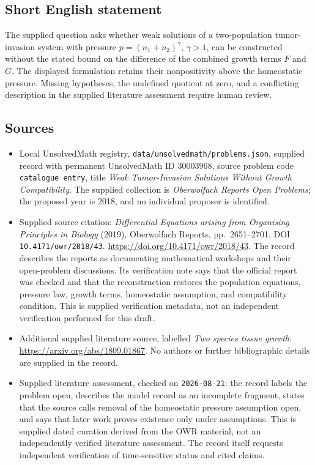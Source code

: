 \documentclass[11pt]{article}
\begin{document}
\subsection{Short English statement}
The supplied question asks whether weak solutions of a two-population tumor-invasion system with pressure \(p=(n_1+n_2)^\gamma\), \(\gamma>1\), can be constructed without the stated bound on the difference of the combined growth terms \(F\) and \(G\). The displayed formulation retains their nonpositivity above the homeostatic pressure. Missing hypotheses, the undefined quotient at zero, and a conflicting description in the supplied literature assessment require human review.
\subsection{Sources}
\begin{itemize}
\item Local UnsolvedMath registry, \texttt{data/unsolvedmath/problems.json}, supplied record with permanent UnsolvedMath ID \(30003968\), source problem code \texttt{catalogue entry}, title \emph{Weak Tumor-Invasion Solutions Without Growth Compatibility}. The supplied collection is \emph{Oberwolfach Reports Open Problems}; the proposed year is 2018, and no individual proposer is identified.
\item Supplied source citation: \emph{Differential Equations arising from Organising Principles in Biology} (2019), Oberwolfach Reports, pp.\ 2651--2701, DOI \texttt{10.4171/owr/2018/43}. \url{https://doi.org/10.4171/owr/2018/43}. The record describes the reports as documenting mathematical workshops and their open-problem discussions. Its verification note says that the official report was checked and that the reconstruction restores the population equations, pressure law, growth terms, homeostatic assumption, and compatibility condition. This is supplied verification metadata, not an independent verification performed for this draft.
\item Additional supplied literature source, labelled \emph{Two species tissue growth}: \url{https://arxiv.org/abs/1809.01867}. No authors or further bibliographic details are supplied in the record.
\item Supplied literature assessment, checked on \texttt{2026-08-21}: the record labels the problem open, describes the model record as an incomplete fragment, states that the source calls removal of the homeostatic pressure assumption open, and says that later work proves existence only under assumptions. This is supplied dated curation derived from the OWR material, not an independently verified literature assessment. The record itself requests independent verification of time-sensitive status and cited claims.
\end{itemize}
\end{document}
